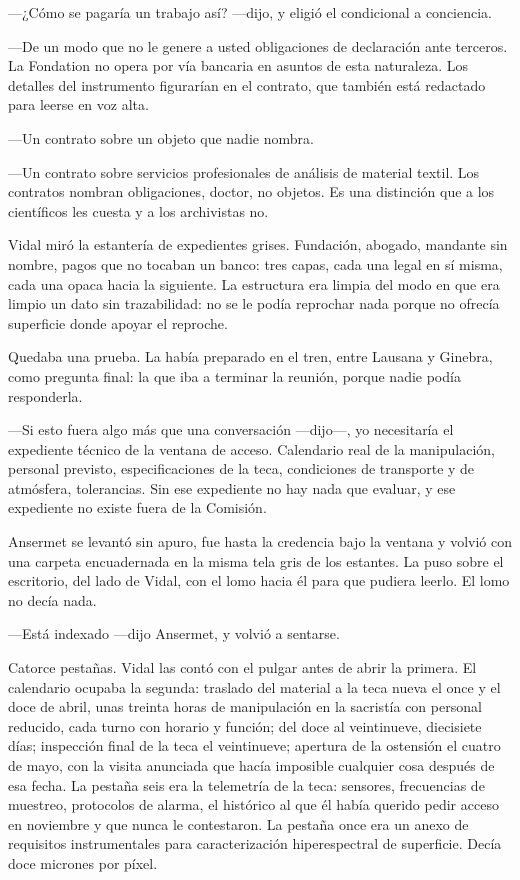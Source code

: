 ---¿Cómo se pagaría un trabajo así? ---dijo, y eligió el condicional a conciencia.

---De un modo que no le genere a usted obligaciones de declaración ante terceros. La Fondation no opera por vía bancaria en asuntos de esta naturaleza. Los detalles del instrumento figurarían en el contrato, que también está redactado para leerse en voz alta.

---Un contrato sobre un objeto que nadie nombra.

---Un contrato sobre servicios profesionales de análisis de material textil. Los contratos nombran obligaciones, doctor, no objetos. Es una distinción que a los científicos les cuesta y a los archivistas no.

Vidal miró la estantería de expedientes grises. Fundación, abogado, mandante sin nombre, pagos que no tocaban un banco: tres capas, cada una legal en sí misma, cada una opaca hacia la siguiente. La estructura era limpia del modo en que era limpio un dato sin trazabilidad: no se le podía reprochar nada porque no ofrecía superficie donde apoyar el reproche.

Quedaba una prueba. La había preparado en el tren, entre Lausana y Ginebra, como pregunta final: la que iba a terminar la reunión, porque nadie podía responderla.

---Si esto fuera algo más que una conversación ---dijo---, yo necesitaría el expediente técnico de la ventana de acceso. Calendario real de la manipulación, personal previsto, especificaciones de la teca, condiciones de transporte y de atmósfera, tolerancias. Sin ese expediente no hay nada que evaluar, y ese expediente no existe fuera de la Comisión.

Ansermet se levantó sin apuro, fue hasta la credencia bajo la ventana y volvió con una carpeta encuadernada en la misma tela gris de los estantes. La puso sobre el escritorio, del lado de Vidal, con el lomo hacia él para que pudiera leerlo. El lomo no decía nada.

---Está indexado ---dijo Ansermet, y volvió a sentarse.

Catorce pestañas. Vidal las contó con el pulgar antes de abrir la primera. El calendario ocupaba la segunda: traslado del material a la teca nueva el once y el doce de abril, unas treinta horas de manipulación en la sacristía con personal reducido, cada turno con horario y función; del doce al veintinueve, diecisiete días; inspección final de la teca el veintinueve; apertura de la ostensión el cuatro de mayo, con la visita anunciada que hacía imposible cualquier cosa después de esa fecha. La pestaña seis era la telemetría de la teca: sensores, frecuencias de muestreo, protocolos de alarma, el histórico al que él había querido pedir acceso en noviembre y que nunca le contestaron. La pestaña once era un anexo de requisitos instrumentales para caracterización hiperespectral de superficie. Decía doce micrones por píxel.

